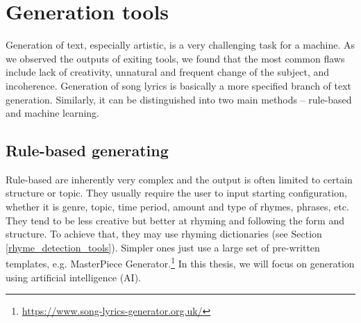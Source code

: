 \section{Generation tools}\label{generation_tools}

Generation of text, especially artistic, is a very challenging task for a machine. As we observed the outputs of exiting tools, we found that the most common flaws include lack of creativity, unnatural and frequent change of the subject, and incoherence. Generation of song lyrics is basically a more specified
branch of text generation. Similarly, it can be distinguished into two main  methods -- rule-based and machine learning.

\subsection{Rule-based generating}
Rule-based  are inherently very complex and the output is often limited to certain structure or topic. They usually require the user to input starting configuration, whether it is genre, topic, time period, amount and type of rhymes, phrases, etc. They tend to be less creative but better at rhyming and following the form and structure. To achieve that, they may use rhyming dictionaries (see Section \ref{rhyme_detection_tools}). Simpler ones just use a large set of pre-written templates, e.g. MasterPiece Generator.\footnote{\url{https://www.song-lyrics-generator.org.uk/}} In this thesis, we will focus on generation using artificial intelligence (AI).

